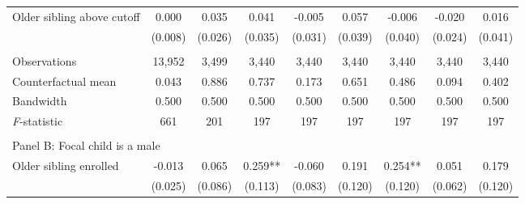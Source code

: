 \begin{table}[!htbp]
{{\begin{tabular}{lcccccccc}
Older sibling above cutoff&       0.000   &       0.035   &       0.041   &      -0.005   &       0.057   &      -0.006   &      -0.020   &       0.016   \\
                    &     (0.008)   &     (0.026)   &     (0.035)   &     (0.031)   &     (0.039)   &     (0.040)   &     (0.024)   &     (0.041)   \\
                    &               &               &               &               &               &               &               &               \\
Observations        &      13,952   &       3,499   &       3,440   &       3,440   &       3,440   &       3,440   &       3,440   &       3,440   \\
Counterfactual mean &       0.043   &       0.886   &       0.737   &       0.173   &       0.651   &       0.486   &       0.094   &       0.402   \\
Bandwidth           &       0.500   &       0.500   &       0.500   &       0.500   &       0.500   &       0.500   &       0.500   &       0.500   \\
\textit{F}-statistic&         661   &         201   &         197   &         197   &         197   &         197   &         197   &         197   \\
 
&  &  &  & & & & & \\
\multicolumn{10}{l}{Panel B: Focal child is a male} \\
Older sibling enrolled&      -0.013   &       0.065   &       0.259** &      -0.060   &       0.191   &       0.254** &       0.051   &       0.179   \\
                    &     (0.025)   &     (0.086)   &     (0.113)   &     (0.083)   &     (0.120)   &     (0.120)   &     (0.062)   &     (0.120)   \\
 

\end{tabular}}}
\end{table}

